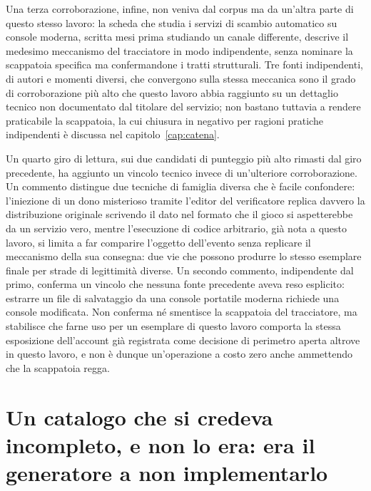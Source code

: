 Una terza corroborazione, infine, non veniva dal corpus ma da un'altra parte di questo stesso lavoro: la scheda che studia i servizi di scambio automatico su console moderna, scritta mesi prima studiando un canale differente, descrive il medesimo meccanismo del tracciatore in modo indipendente, senza nominare la scappatoia specifica ma confermandone i tratti strutturali. Tre fonti indipendenti, di autori e momenti diversi, che convergono sulla stessa meccanica sono il grado di corroborazione più alto che questo lavoro abbia raggiunto su un dettaglio tecnico non documentato dal titolare del servizio; non bastano tuttavia a rendere praticabile la scappatoia, la cui chiusura in negativo per ragioni pratiche indipendenti è discussa nel capitolo~\ref{cap:catena}.

Un quarto giro di lettura, sui due candidati di punteggio più alto rimasti dal giro precedente, ha aggiunto un vincolo tecnico invece di un'ulteriore corroborazione. Un commento distingue due tecniche di famiglia diversa che è facile confondere: l'iniezione di un dono misterioso tramite l'editor del verificatore replica davvero la distribuzione originale scrivendo il dato nel formato che il gioco si aspetterebbe da un servizio vero, mentre l'esecuzione di codice arbitrario, già nota a questo lavoro, si limita a far comparire l'oggetto dell'evento senza replicare il meccanismo della sua consegna: due vie che possono produrre lo stesso esemplare finale per strade di legittimità diverse. Un secondo commento, indipendente dal primo, conferma un vincolo che nessuna fonte precedente aveva reso esplicito: estrarre un file di salvataggio da una console portatile moderna richiede una console modificata. Non conferma né smentisce la scappatoia del tracciatore, ma stabilisce che farne uso per un esemplare di questo lavoro comporta la stessa esposizione dell'account già registrata come decisione di perimetro aperta altrove in questo lavoro, e non è dunque un'operazione a costo zero anche ammettendo che la scappatoia regga.

\section{Un catalogo che si credeva incompleto, e non lo era: era il generatore a non implementarlo}

